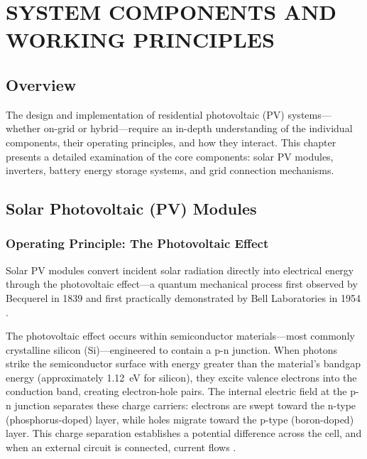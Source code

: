 
\chapter{SYSTEM COMPONENTS AND WORKING PRINCIPLES}

\section{Overview}

The design and implementation of residential photovoltaic (PV) systems---whether on-grid or hybrid---require an in-depth understanding of the individual components, their operating principles, and how they interact. This chapter presents a detailed examination of the core components: solar PV modules, inverters, battery energy storage systems, and grid connection mechanisms.


\section{Solar Photovoltaic (PV) Modules}

\subsection{Operating Principle: The Photovoltaic Effect}

Solar PV modules convert incident solar radiation directly into electrical energy through the photovoltaic effect---a quantum mechanical process first observed by Becquerel in 1839 and first practically demonstrated by Bell Laboratories in 1954 \cite{chapin1954}.

The photovoltaic effect occurs within semiconductor materials---most commonly crystalline silicon (Si)---engineered to contain a p-n junction. When photons strike the semiconductor surface with energy greater than the material's bandgap energy (approximately 1.12~eV for silicon), they excite valence electrons into the conduction band, creating electron-hole pairs. The internal electric field at the p-n junction separates these charge carriers: electrons are swept toward the n-type (phosphorus-doped) layer, while holes migrate toward the p-type (boron-doped) layer. This charge separation establishes a potential difference across the cell, and when an external circuit is connected, current flows \cite{green2003,luque2011}.

